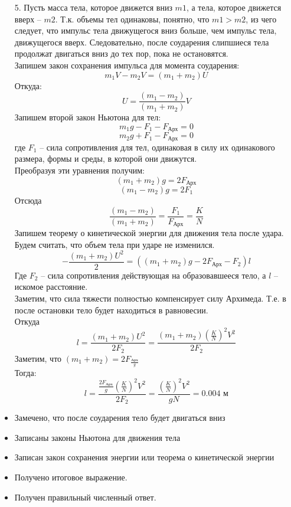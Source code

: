 \begin{enumerate}
\item [5.] Пусть масса тела, которое движется вниз $m1$, а тела, которое движется вверх – $m2$. Т.к. объемы тел одинаковы, понятно, что $m1 > m2$, из чего следует, что импульс тела движущегося вниз больше, чем импульс тела, движущегося вверх. Следовательно, после соударения слипшиеся тела продолжат двигаться вниз до тех пор, пока не остановятся.\\
Запишем закон сохранения импульса для момента соударения:
$$m_1V-m_2V=(m_1+m_2)U$$
Откуда: 
$$U=\frac{(m_1-m_2)}{(m_1+m_2 )}V$$
Запишем второй закон Ньютона для тел:
$$m_1 g-F_1-F_\text{Арх}=0$$
$$m_2 g+F_1-F_\text{Арх}=0$$
где $F_1$ – сила сопротивления для тел, одинаковая в силу их одинакового размера, формы и среды, в которой они движутся.\\
Преобразуя эти уравнения получим:
$$(m_1+m_2)g=2F_\text{Арх}$$
$$(m_1-m_2)g=2F_1$$
Отсюда
$$\frac{(m_1-m_2)}{(m_1+m_2)}=\frac{F_1}{F_\text{Арх}}=\frac{K}{N}$$
Запишем теорему о кинетической энергии для движения тела после удара. Будем считать, что объем тела при ударе не изменился.
$$-\frac{(m_1+m_2)U^2}{2}=\left((m_1+m_2)g-2F_\text{Арх}-F_2\right)l$$
Где $F_2$ – сила сопротивления действующая на образовавшееся тело, а $l$ – искомое расстояние.\\
Заметим, что сила тяжести полностью компенсирует силу Архимеда. Т.е. в после остановки тело будет находиться в равновесии.\\
Откуда 
$$l=\frac{(m_1+m_2)U^2}{2F_2}=\frac{(m_1+m_2)\left(\frac{K}{N}\right)^2V^2}{2F_2}$$
Заметим, что $(m_1+m_2)=2F_\frac{\text{Арх}}{g}$\\
Тогда:
$$l=\frac{\frac{2F_\text{Арх}}{g}\left(\frac{K}{N}\right)^2V^2}{2F_2}=\frac{\left(\frac{K}{N}\right)^2V^2}{gN}=0.004\text{ м}$$
\end{enumerate}
\additionalCriteria
\begin{itemize}
\item Замечено, что после соударения тело будет двигаться вниз
\item Записаны законы Ньютона для движения тела
\item Записан закон сохранения энергии или теорема о кинетической энергии
\item Получено итоговое выражение.
\item Получен правильный численный ответ.
\end{itemize}